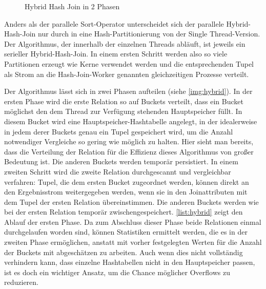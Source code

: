 \documentclass[a4paper,12pt,twoside]{article}
\begin{document}
\begin{figure}
	\centering
	\qquad
	\caption{Hybrid Hash Join in 2 Phasen \autocite{Richly2009}}
	\label{img:hybrid}
\end{figure}

Anders als der parallele Sort-Operator unterscheidet sich der parallele Hybrid-Hash-Join nur durch in eine Hash-Partitionierung von der Single Thread-Version. Der Algorithmus, der innerhalb der einzelnen Threads abläuft, ist jeweils ein serieller Hybrid-Hash-Join. In einem ersten Schritt werden also so viele Partitionen erzeugt wie Kerne verwendet werden und die entsprechenden Tupel als Strom an die Hash-Join-Worker genannten gleichzeitigen Prozesse verteilt.

Der Algorithmus lässt sich in zwei Phasen aufteilen (siehe \autoref{img:hybrid}). In der ersten Phase wird die erste Relation so auf Buckets verteilt, dass ein Bucket möglichst den dem Thread zur Verfügung stehenden Hauptspeicher füllt. In diesem Bucket wird eine Hauptspeicher-Hashtabelle angelegt, in der idealerweise in jedem derer Buckets genau ein Tupel gespeichert wird, um die Anzahl notwendiger Vergleiche so gering wie möglich zu halten. Hier sieht man bereits, dass die Verteilung der Relation für die Effizienz dieses Algorithmus von großer Bedeutung ist. Die anderen Buckets werden temporär persistiert. In einem zweiten Schritt wird die zweite Relation durchgescannt und vergleichbar verfahren: Tupel, die dem ersten Bucket zugeordnet werden, können direkt an den Ergebnisstrom weitergegeben werden, wenn sie in den Joinattributen mit dem Tupel der ersten Relation übereinstimmen. Die anderen Buckets werden wie bei der ersten Relation temporär zwischengespeichert. \autoref{list:hybrid} zeigt den Ablauf der ersten Phase. Da zum Abschluss dieser Phase beide Relationen einmal durchgelaufen worden sind, können Statistiken ermittelt werden, die es in der zweiten Phase ermöglichen, anstatt mit vorher festgelegten Werten für die Anzahl der Buckets mit abgeschätzen zu arbeiten. Auch wenn dies nicht vollständig verhindern kann, dass einzelne Hashtabellen nicht in den Hauptspeicher passen, ist es doch ein wichtiger Ansatz, um die Chance möglicher Overflows zu reduzieren.   
\end{document}
